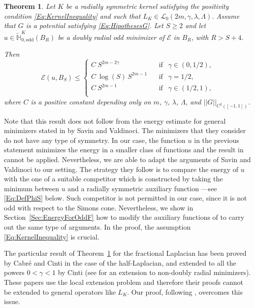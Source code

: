 \documentclass[12pt,reqno]{amsart}
\newtheorem{theorem}{Theorem}[section]
\theoremstyle{definition}
\theoremstyle{remark}
\newcommand{\con}[1]{\mathbb{#1}}
\renewcommand{\H}{\con{H}}
\newcommand{\ecal}{\mathcal{E}}
\newcommand{\lcal}{\mathcal{L}}
\newcommand{\norm}[1]{\left | \left |{#1} \right | \right |}
\newcommand{\s}{\gamma}
\numberwithin{equation}{section}
\begin{document}
\begin{theorem}
	\label{Th:EnergyEstimate} 
	Let $K$ be a radially symmetric kernel satisfying the positivity condition \eqref{Eq:KernelInequality} and such that $L_K\in \lcal_0(2m, \s, \lambda, \Lambda)$. Assume that $G$ is a potential satisfying \eqref{Eq:HipothesesG}. Let $S\geq2$ and let $u\in \widetilde{\H}^K_{0, \mathrm{odd}}(B_R)$ be a doubly radial odd minimizer of $\ecal$ in $B_R$, with $R>S+4$. 
	
	Then
	\begin{equation}
	\label{Eq:EnergyEstimate} 
	\ecal (u,B_S) \leq 
	\begin{cases}
	C \ S^{2m-2\s}\ \ \ \ &\textrm{if } \ \ \s\in(0,1/2),\\
	C\ \log(S)\,S^{2m-1}\ \ \ \ &\textrm{if } \ \ \s=1/2,\\
	C \ S^{2m-1}\ \ \ \ &\textrm{if } \ \ \s\in(1/2,1),\\
	\end{cases}
	\end{equation}
	where $C$ is a positive constant depending only on $m$, $\s$, $\lambda$, $\Lambda$, and $\norm{G}_{C^2([-1,1])}$.
\end{theorem}

Note that this result does not follow from the energy estimate for general minimizers 
stated in \cite{SavinValdinoci-EnergyEstimate} by Savin and Valdinoci. The minimizers that they consider do not have any type of symmetry. In our case, the function $u$ in the previous statement minimizes the energy in a smaller class of functions and the result in \cite{SavinValdinoci-EnergyEstimate} cannot be applied. Nevertheless, we are able to adapt the arguments of Savin and Valdinoci to our setting.  The strategy they follow is to compare the energy of $u$ with the one of a suitable competitor which is constructed by taking the minimum between $u$ and a radially symmetric auxiliary function ---see \eqref{Eq:DefPhiS} below. Such competitor is not permitted in our case, since it is not odd with respect to the Simons cone. Nevertheless, we show in Section~\ref{Sec:EnergyForOddF} how to modify the auxiliary functions of \cite{SavinValdinoci-EnergyEstimate} to carry out the same type of arguments. In the proof, the assumption \eqref{Eq:KernelInequality} is crucial.

The particular result of Theorem~\ref{Th:EnergyEstimate} for the fractional Laplacian has been proved by Cabré and Cinti \cite{CabreCinti-EnergyHalfL} in the case of the half-Laplacian, and extended to all the powers $0<\s<1$ by Cinti \cite{Cinti-Saddle2} (see \cite{CabreCinti-SharpEnergy} for an extension to non-doubly radial minimizers). These papers use the local extension problem and therefore their proofs cannot be extended to general operators like $L_K$. Our proof, following \cite{SavinValdinoci-EnergyEstimate}, overcomes this issue.
\end{document}
